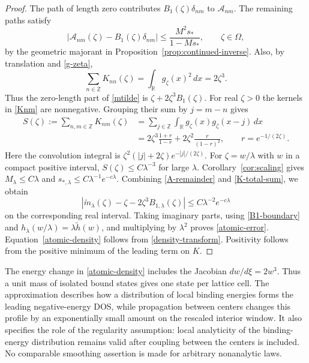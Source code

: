 \documentclass[12pt,a4paper]{article}
\numberwithin{equation}{section}
\newcommand{\R}{\mathbb R}
\newcommand{\Z}{\mathbb Z}
\newcommand{\cA}{\mathcal A}
\newcommand{\Om}{\Omega}
\begin{document}
\begin{proof}
The path of length zero contributes
$B_1(\zeta)\delta_{nm}$ to $\cA_{nm}$.  The remaining paths satisfy
\begin{equation}
 \left|\cA_{nm}(\zeta)-B_1(\zeta)\delta_{nm}\right|
 \le\frac{M^2s_*}{1-Ms_*},\qquad\zeta\in\Om,
\label{A-remainder}
\end{equation}
by the geometric majorant in Proposition~\ref{prop:continued-inverse}.
Also, by translation and \eqref{g-zeta},
\begin{equation}
 \sum_{n\in\Z}K_{nn}(\zeta)
 =\int_\R g_\zeta(x)^2\,d x=2\zeta^3.
\label{K-diagonal-sum}
\end{equation}
Thus the zero-length part of \eqref{mtilde} is
$\zeta+2\zeta^3B_1(\zeta)$.  For real $\zeta>0$ the kernels in
\eqref{Knm} are nonnegative.  Grouping their sum by $j=m-n$ gives
\begin{equation}
\begin{split}
 S(\zeta):=\sum_{n,m\in\Z}K_{nm}(\zeta)
 &=\sum_{j\in\Z}\int_\R g_\zeta(x)g_\zeta(x-j)\,d x\\
 &=2\zeta^3\frac{1+r}{1-r}
   +2\zeta^2\frac{r}{(1-r)^2},\qquad
 r=e^{-1/(2\zeta)}.
\end{split}
\label{K-total-sum}
\end{equation}
Here the convolution integral is
$\zeta^2(|j|+2\zeta)e^{-|j|/(2\zeta)}$.
For $\zeta=w/\lambda$ with $w$ in a compact positive interval,
$S(\zeta)\le C\lambda^{-3}$ for large $\lambda$.
Corollary~\ref{cor:scaling} gives
$M_\lambda\le C\lambda$ and
$s_{*,\lambda}\le C\lambda^{-1}e^{-c\lambda}$.
Combining \eqref{A-remainder} and \eqref{K-total-sum}, we obtain
\begin{equation}
 \left|\widetilde m_\lambda(\zeta)
       -\zeta-2\zeta^3B_{1,\lambda}(\zeta)\right|
 \le C\lambda^{-2}e^{-c\lambda}
\label{m-atomic-remainder}
\end{equation}
on the corresponding real interval.  Taking imaginary parts, using
\eqref{B1-boundary} and $h_\lambda(w/\lambda)=\lambda\widetilde h(w)$,
and multiplying by $\lambda^2$ proves \eqref{atomic-error}.
Equation~\eqref{atomic-density} follows from \eqref{density-transform}.
Positivity follows from the positive minimum of the leading term on $K$.
\end{proof}

The energy change in \eqref{atomic-density} includes the Jacobian
$d w/d\xi=2w^3$.  Thus a unit mass of isolated bound states gives one state
per lattice cell.  The approximation describes how a distribution of local
binding energies forms the leading negative-energy DOS, while propagation
between centers changes this profile by an exponentially small amount on the
rescaled interior window.  It also specifies the role of the regularity
assumption: local analyticity of the binding-energy
distribution remains valid after coupling between the centers is included.  No
comparable smoothing assertion is made for arbitrary nonanalytic laws.
\end{document}
